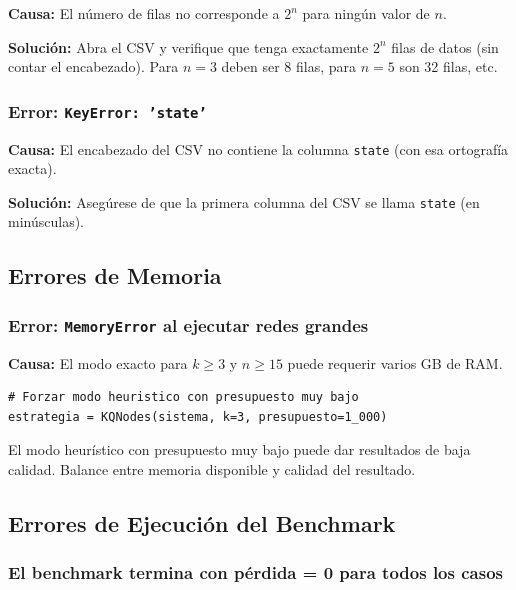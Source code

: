 \textbf{Causa:} El número de filas no corresponde a $2^n$ para ningún valor de $n$.

\textbf{Solución:} Abra el CSV y verifique que tenga exactamente $2^n$ filas de datos (sin contar el encabezado). Para $n=3$ deben ser 8 filas, para $n=5$ son 32 filas, etc.

\subsubsection{Error: \texttt{KeyError: 'state'}}

\textbf{Causa:} El encabezado del CSV no contiene la columna \texttt{state} (con esa ortografía exacta).

\textbf{Solución:} Asegúrese de que la primera columna del CSV se llama \texttt{state} (en minúsculas).

\subsection{Errores de Memoria}

\subsubsection{Error: \texttt{MemoryError} al ejecutar redes grandes}

\textbf{Causa:} El modo exacto para $k \geq 3$ y $n \geq 15$ puede requerir varios GB de RAM.

\begin{lstlisting}[style=python, caption={Reducir el presupuesto para forzar modo heurístico.}]
# Forzar modo heuristico con presupuesto muy bajo
estrategia = KQNodes(sistema, k=3, presupuesto=1_000)
\end{lstlisting}

\begin{aviso}
El modo heurístico con presupuesto muy bajo puede dar resultados de baja calidad. Balance entre memoria disponible y calidad del resultado.
\end{aviso}

\subsection{Errores de Ejecución del Benchmark}

\subsubsection{El benchmark termina con pérdida = 0 para todos los casos}

